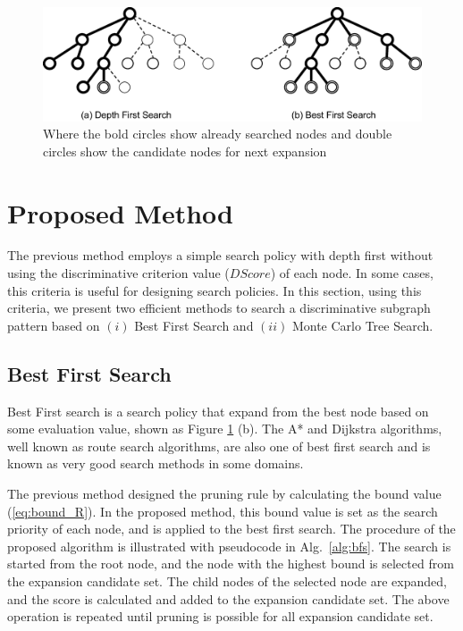 \begin{figure}[t]
  	\centering
  	\includegraphics[width=0.9\linewidth]{img/search.eps}
	\caption{
		Where the bold circles show already searched nodes and 
		double circles show the candidate nodes for next expansion}
  	\label{fig:search}
\end{figure}

\section{Proposed Method}
The previous method employs a simple search policy with depth first
without using the discriminative criterion value ($DScore$) of each node.
In some cases, this criteria is useful for designing search policies.
In this section, using this criteria, 
we present two efficient methods to search a discriminative subgraph pattern 
based on $(i)$ Best First Search and $(ii)$ Monte Carlo Tree Search.

\subsection{Best First Search}
Best First search \cite{pearl:1984} is a search policy 
that expand from the best node based on some evaluation value, shown as Figure \ref{fig:search} (b).
The A* and Dijkstra algorithms, well known as route search algorithms, 
are also one of best first search and is known as very good search methods in some domains.

The previous method designed the pruning rule 
by calculating the bound value (\ref{eq:bound_R}). 
In the proposed method, this bound value is set as the search priority of each node, 
and is applied to the best first search.
The procedure of the proposed algorithm is illustrated with pseudocode in 
Alg.~\ref{alg:bfs}.
The search is started from the root node, 
and the node with the highest bound is selected from the expansion candidate set.
The child nodes of the selected node are expanded, 
and the score is calculated and added to the expansion candidate set.
The above operation is repeated until pruning is possible for all expansion candidate set.\\

